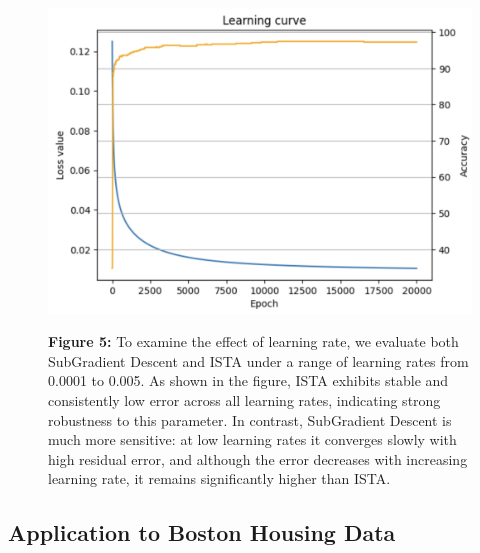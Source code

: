 \documentclass[11pt]{article}
\begin{document}
\begin{figure}[H]
    \centering
    \begin{minipage}{0.3\textwidth}
        \includegraphics[width=\linewidth]{figures/fig1.png}
    \end{minipage}
    \hfill
    \begin{minipage}{0.5\textwidth}
        \small
        \textbf{Figure 5:}
        To examine the effect of learning rate, we evaluate both SubGradient Descent and ISTA under a range of learning rates from 0.0001 to 0.005.
        As shown in the figure, ISTA exhibits stable and consistently low error across all learning rates, indicating strong robustness to this parameter. In contrast, SubGradient Descent is much more sensitive: at low learning rates it converges slowly with high residual error, and although the error decreases with increasing learning rate, it remains significantly higher than ISTA.
    \end{minipage}
\end{figure}

\subsection{Application to Boston Housing Data}
\end{document}
